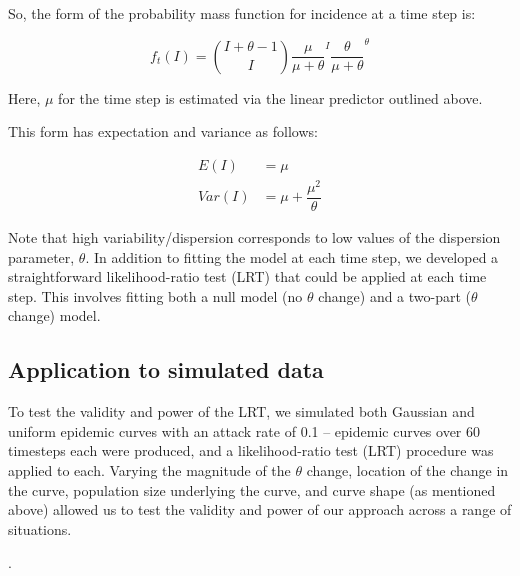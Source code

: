 \documentclass[10pt,letterpaper]{article}
\begin{document}
So, the form of the probability mass function for incidence at a time step is:

\begin{equation}
  f_t(I) = \binom{I + \theta - 1}{I} \dfrac{\mu}{\mu+\theta}^I \dfrac{\theta}{\mu +\theta}^\theta
\end{equation}

Here, \begin{math}\mu\end{math} for the time step is estimated via the linear predictor outlined above.

This form has expectation and variance as follows:

\begin{align}
  E(I) &= \mu\\
  Var(I) &= \mu + \dfrac{\mu^2}{\theta}
\end{align}

\noindent Note that high variability/dispersion corresponds to low values of the dispersion parameter, \begin{math}\theta\end{math}.
\noindent In addition to fitting the model at each time step, we developed a straightforward likelihood-ratio test (LRT) that could be applied at each time step. This involves fitting both a null model (no \begin{math}\theta\end{math} change) and a two-part (\begin{math}\theta\end{math} change) model.

\subsection*{Application to simulated data}

To test the validity and power of the LRT, we simulated both Gaussian and uniform epidemic curves with an attack rate of 0.1 -- epidemic curves over 60 timesteps each were produced, and a likelihood-ratio test (LRT) procedure was applied to each. 
Varying the magnitude of the \begin{math}\theta\end{math} change, location of the change in the curve, population size underlying the curve, and curve shape (as mentioned above) allowed us to test the validity and power of our approach across a range of situations.

.
\end{document}
